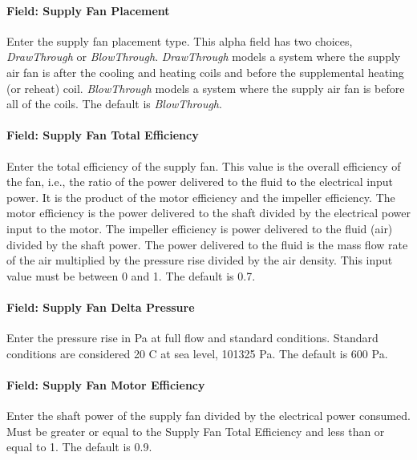 \paragraph{Field: Supply Fan Placement}\label{field-supply-fan-placement-6}

Enter the supply fan placement type. This alpha field has two choices, \emph{DrawThrough} or \emph{BlowThrough}. \emph{DrawThrough} models a system where the supply air fan is after the cooling and heating coils and before the supplemental heating (or reheat) coil. \emph{BlowThrough} models a system where the supply air fan is before all of the coils. The default is \emph{BlowThrough}.

\paragraph{Field: Supply Fan Total Efficiency}\label{field-supply-fan-total-efficiency-7}

Enter the total efficiency of the supply fan. This value is the overall efficiency of the fan, i.e., the ratio of the power delivered to the fluid to the electrical input power. It is the product of the motor efficiency and the impeller efficiency. The motor efficiency is the power delivered to the shaft divided by the electrical power input to the motor. The impeller efficiency is power delivered to the fluid (air) divided by the shaft power. The power delivered to the fluid is the mass flow rate of the air multiplied by the pressure rise divided by the air density. This input value must be between 0 and 1. The default is 0.7.

\paragraph{Field: Supply Fan Delta Pressure}\label{field-supply-fan-delta-pressure-6}

Enter the pressure rise in Pa at full flow and standard conditions. Standard conditions are considered 20 C at sea level, 101325 Pa. The default is 600 Pa.

\paragraph{Field: Supply Fan Motor Efficiency}\label{field-supply-fan-motor-efficiency-7}

Enter the shaft power of the supply fan divided by the electrical power consumed. Must be greater or equal to the Supply Fan Total Efficiency and less than or equal to 1. The default is 0.9.

